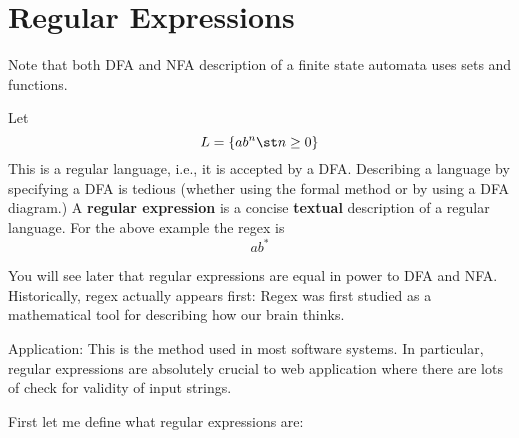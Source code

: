 \section{Regular Expressions}

\begin{comment}
\textbf{Objectives}
\begin{tightlist}
\item Verify if an expression is an regular expression
\item Describe informal the language generated by a regex
\item Given an informal description of a regular language,
  write down the corresponding regex
\item Translate between a regex and a state diagram
\item Translate between a regex and a DFA
\item Translate between a regex and an NFA
\end{tightlist}
\mbox{}
\end{comment}

Note that both DFA and NFA description of a finite state automata
uses sets and functions.

Let
\[
L = \{ a b^n \st n \geq 0 \}
\]
This is a regular language, i.e., it is accepted by a DFA.
Describing a language by specifying a DFA is tedious
(whether using the formal method or by using a DFA diagram.)
A \textbf{regular expression} is a concise \textbf{textual} description
of a regular language. For the above example the regex is
\[
ab^*
\]

You will see later that regular expressions are equal in power to
DFA and NFA. 
Historically, regex actually appears first: 
Regex was first studied as a mathematical tool for describing
how our brain thinks.

Application: This is the method used in most software
systems. In particular, regular expressions are absolutely crucial
to web application where there are lots of check for validity of
input strings.

First let me define what regular expressions are:

